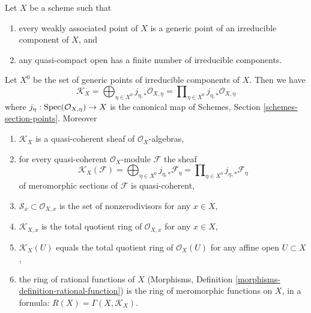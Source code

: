 \begin{lemma}
\label{lemma-meromorphic-weakass-finite}
Let $X$ be a scheme such that
\begin{enumerate}
\item[(a)] every weakly associated point of $X$ is a generic point of an
irreducible component of $X$, and
\item[(b)] any quasi-compact open has a finite number of irreducible components.
\end{enumerate}
Let $X^0$ be the set of generic points of irreducible components of $X$.
Then we have
$$
\mathcal{K}_X =
\bigoplus\nolimits_{\eta \in X^0} j_{\eta, *}\mathcal{O}_{X, \eta} =
\prod\nolimits_{\eta \in X^0} j_{\eta, *}\mathcal{O}_{X, \eta}
$$
where $j_\eta : \mathop{\mathrm{Spec}}(\mathcal{O}_{X, \eta}) \to X$ is the canonical map
of Schemes, Section \ref{schemes-section-points}. Moreover
\begin{enumerate}
\item $\mathcal{K}_X$ is a quasi-coherent sheaf of
$\mathcal{O}_X$-algebras,
\item for every quasi-coherent $\mathcal{O}_X$-module $\mathcal{F}$ the sheaf
$$
\mathcal{K}_X(\mathcal{F}) =
\bigoplus\nolimits_{\eta \in X^0} j_{\eta, *}\mathcal{F}_\eta =
\prod\nolimits_{\eta \in X^0} j_{\eta, *}\mathcal{F}_\eta
$$
of meromorphic sections of $\mathcal{F}$
is quasi-coherent,
\item $\mathcal{S}_x \subset \mathcal{O}_{X, x}$
is the set of nonzerodivisors for any $x \in X$,
\item $\mathcal{K}_{X, x}$ is the total quotient ring of $\mathcal{O}_{X, x}$
for any $x \in X$,
\item $\mathcal{K}_X(U)$ equals the total quotient ring of $\mathcal{O}_X(U)$
for any affine open $U \subset X$,
\item the ring of rational functions of $X$
(Morphisms, Definition \ref{morphisms-definition-rational-function})
is the ring of meromorphic
functions on $X$, in a formula: $R(X) = \Gamma(X, \mathcal{K}_X)$.
\end{enumerate}
\end{lemma}

